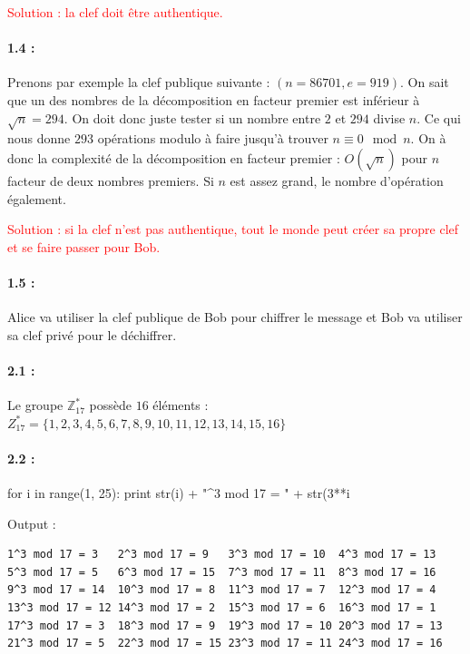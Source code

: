 \documentclass[11pt,a4paper]{report}
\begin{document}
\textcolor{red}{Solution : la clef doit être authentique.}

\paragraph*{1.4 : } Prenons par exemple la clef publique suivante : $(n=86701,e=919)$. On sait que un des nombres de la décomposition en facteur premier est inférieur à $\sqrt{n} = 294$. On doit donc juste tester si un nombre entre $2$ et $294$ divise $n$. Ce qui nous donne $293$ opérations modulo à faire jusqu'à trouver $n \equiv 0 \mod n$. On à donc la complexité de la décomposition en facteur premier : $O(\sqrt{n})$ pour $n$ facteur de deux nombres premiers. Si $n$ est assez grand, le nombre d'opération également.

\textcolor{red}{Solution : si la clef n'est pas authentique, tout le monde peut créer sa propre clef et se faire passer pour Bob.}

\paragraph*{1.5 : } Alice va utiliser la clef publique de Bob pour chiffrer le message et Bob va utiliser sa clef privé pour le déchiffrer.

\paragraph*{2.1 : } Le groupe $\mathbb{Z}^*_{17}$ possède $16$ éléments : $Z^*_{17} = \{1,2,3,4,5,6,7,8,9,10,11,12,13,14,15,16\}$
 
\paragraph*{2.2 : }
\begin{pythoncode}
for i in range(1, 25):
    print str(i) + "^3 mod 17 = " + str(3**i %
\end{pythoncode}

Output :

\begin{verbatim}
1^3 mod 17 = 3   2^3 mod 17 = 9   3^3 mod 17 = 10  4^3 mod 17 = 13
5^3 mod 17 = 5   6^3 mod 17 = 15  7^3 mod 17 = 11  8^3 mod 17 = 16
9^3 mod 17 = 14  10^3 mod 17 = 8  11^3 mod 17 = 7  12^3 mod 17 = 4
13^3 mod 17 = 12 14^3 mod 17 = 2  15^3 mod 17 = 6  16^3 mod 17 = 1
17^3 mod 17 = 3  18^3 mod 17 = 9  19^3 mod 17 = 10 20^3 mod 17 = 13
21^3 mod 17 = 5  22^3 mod 17 = 15 23^3 mod 17 = 11 24^3 mod 17 = 16
\end{verbatim}
\end{document}
